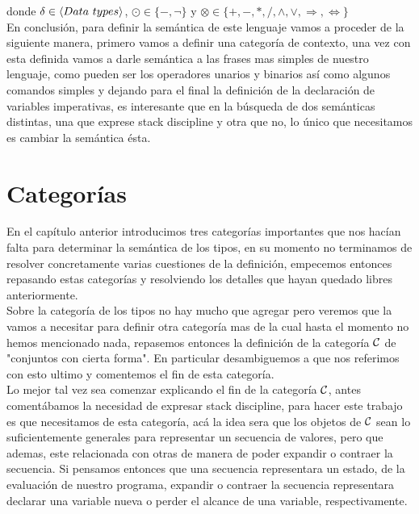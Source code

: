 donde $\delta \in \lrangles{Data \ types}$, $\odot \in \{-, \neg\}$ y 
$\otimes \in \{+,-,*,/,\wedge,\vee,\Rightarrow,\Leftrightarrow\}$\\

En conclusi\'on, para definir la sem\'antica de este lenguaje vamos 
a proceder de la siguiente manera, primero vamos a definir una categor\'ia
de contexto, una vez con esta definida vamos a darle sem\'antica a las frases
mas simples de nuestro lenguaje, como pueden ser los operadores unarios y binarios
as\'i como algunos comandos simples y dejando para el final la definici\'on
de la declaraci\'on de variables imperativas, es interesante que en la 
b\'usqueda de dos sem\'anticas distintas, una que exprese stack discipline
y otra que no, lo \'unico que necesitamos es cambiar la sem\'antica \'esta.

\section{Categor\'ias}

En el cap\'itulo anterior introducimos tres categor\'ias importantes que
nos hac\'ian falta para determinar la sem\'antica de los tipos, en su
momento no terminamos de resolver concretamente varias cuestiones de la
definici\'on, empecemos entonces repasando estas categor\'ias y resolviendo
los detalles que hayan quedado libres anteriormente. \\
Sobre la categor\'ia de los tipos no hay mucho que agregar pero veremos que
la vamos a necesitar para definir otra categor\'ia mas de la cual hasta el
momento no hemos mencionado nada, repasemos entonces la definici\'on de la
categor\'ia $\mathcal{C}$ de "conjuntos con cierta forma". En particular desambiguemos 
a que nos referimos con esto ultimo y comentemos el fin de esta categor\'ia.\\

Lo mejor tal vez sea comenzar explicando el fin de la categor\'ia $\mathcal{C}$, antes
coment\'abamos la necesidad de expresar stack discipline, para hacer este
trabajo es que necesitamos de esta categor\'ia, ac\'a la idea sera que los
objetos de $\mathcal{C}$ sean lo suficientemente generales para representar un secuencia
de valores, pero que ademas, este relacionada con otras de manera de poder
expandir o contraer la secuencia. Si pensamos entonces que una secuencia 
representara un estado, de la evaluaci\'on de nuestro programa, expandir o
contraer la secuencia representara declarar una variable nueva o perder el
alcance de una variable, respectivamente.\\

